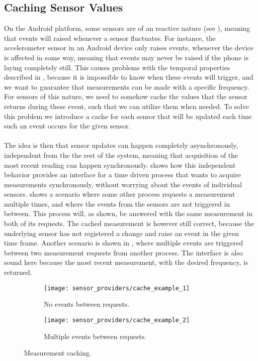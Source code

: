 \subsection{Caching Sensor Values}
\label{sub:caching_sensor_values}
On the Android platform, some sensors are of an reactive nature (see ), meaning that events will raised whenever a sensor fluctuates. For instance, the accelerometer sensor in an Android device only raises events, whenever the device is affected in some way, meaning that events may never be raised if the phone is laying completely still. This causes problems with the temporal properties described in , because it is impossible to know when these events will trigger, and we want to guarantee that measurements can be made with a specific frequency. For sensors of this nature, we need to somehow cache the values that the sensor returns during these event, such that we can utilize them when needed. To solve this problem we introduce a cache for each sensor that will be updated each time such an event occurs for the given sensor.
\\\\
The idea is then that sensor updates can happen completely asynchronously, independent from the the rest of the system, meaning that acquisition of the most recent reading can happen synchronously.  shows how this independent behavior provides an interface for a time driven process that wants to acquire measurements synchronously, without worrying about the events of individual sensors.  shows a scenario where some other process requests a measurement multiple times, and where the events from the sensors are not triggered in between. This process will, as shown, be answered with the same measurement in both of its requests. The cached measurement is however still correct, because the underlying sensor has not registered a change and raise an event in the given time frame. Another scenario is shown in , where multiple events are triggered between two measurement requests from another process. The interface is also sound here because the most recent measurement, with the desired frequency, is returned.

\begin{figure}[!htbp]
\begin{subfigure}[!t]{.5\textwidth}
  \centering
  \texttt{[image: sensor\_providers/cache\_example\_1]}
  \caption{No events between requests.}
  \label{fig:cache_no_event_between}
\end{subfigure}
\begin{subfigure}[!t]{.5\textwidth}
  \centering
  \texttt{[image: sensor\_providers/cache\_example\_2]}
  \caption{Multiple events between requests.}
  \label{fig:cache_multiple_event_between}
\end{subfigure}
\caption{Measurement caching.}
\label{fig:cache_examples}
\end{figure}
\FloatBarrier

